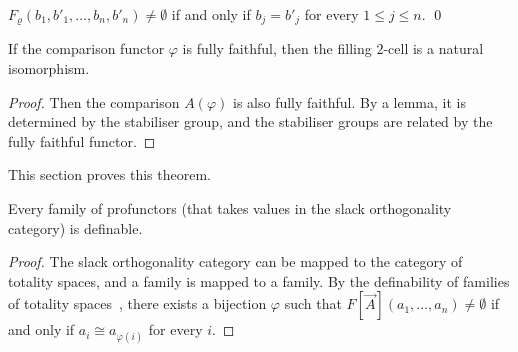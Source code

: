 \begin{lemma}
    \( F_\varrho(b_1, b'_1, \dots, b_n, b'_n) \neq \emptyset \) if and only if \( b_j = b'_j \) for every \( 1 \le j \le n \).
    \qed
\end{lemma}

\begin{lemma}
    If the comparison functor \( \varphi \) is fully faithful, then the filling \( 2 \)-cell is a natural isomorphism.
\end{lemma}
\begin{proof}
    Then the comparison \( A(\varphi) \) is also fully faithful.
    By a lemma, it is determined by the stabiliser group, and the stabiliser groups are related by the fully faithful functor.
\end{proof}

This section proves this theorem.

\begin{theorem}
    Every family of profunctors (that takes values in the slack orthogonality category) is definable.
\end{theorem}
\begin{proof}
    The slack orthogonality category can be mapped to the category of totality spaces, and a family is mapped to a family.
    By the definability of families of totality spaces~\cite{Loader1994}, there exists a bijection \( \varphi \) such that \( F[\vec{A}](a_1,\dots,a_n) \neq \emptyset \) if and only if \( a_i \cong a_{\varphi(i)} \) for every \( i \).
\end{proof}



